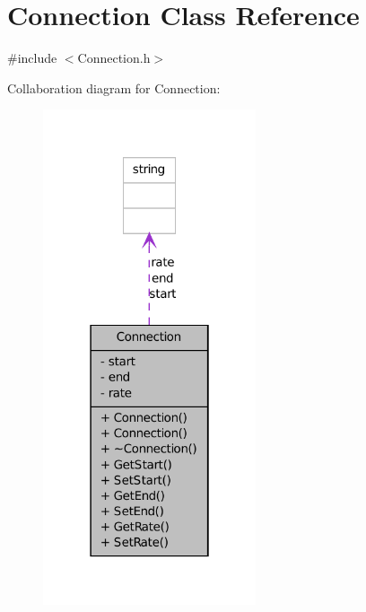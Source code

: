 \hypertarget{classConnection}{
\section{Connection Class Reference}
\label{classConnection}
}


{\ttfamily \#include $<$Connection.h$>$}



Collaboration diagram for Connection:\nopagebreak
\begin{figure}[H]
\begin{center}
\leavevmode
\includegraphics[width=178pt]{classConnection__coll__graph}
\end{center}
\end{figure}
